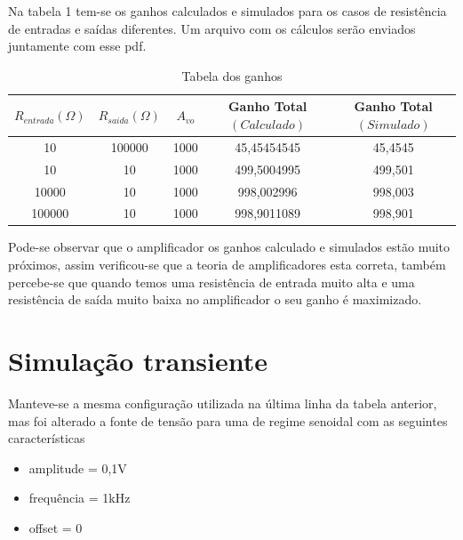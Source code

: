 \documentclass[a4paper, 12pt]{article}
\begin{document}
Na tabela 1 tem-se os ganhos calculados e simulados para os casos de resistência de entradas e saídas diferentes. Um arquivo com os cálculos serão enviados juntamente com esse pdf.
\begin{table}[H]
\centering
\caption{Tabela dos ganhos}
\label{my-label}
\begin{tabular}{|c|c|c|c|c|}
\hline
\textbf{$R_{entrada} (\Omega)$} & \textbf{$R_{saida} (\Omega)$} & \textbf{$A_{vo}$} & \textbf{Ganho Total $( Calculado )$} & \textbf{Ganho Total $( Simulado )$} \\ \hline
10                              & 100000                        & 1000              & 45,45454545                        & 45,4545                           \\ \hline
10                              & 10                            & 1000              & 499,5004995                        & 499,501                           \\ \hline
10000                           & 10                            & 1000              & 998,002996                         & 998,003                           \\ \hline
100000                          & 10                            & 1000              & 998,9011089                        & 998,901                           \\ \hline
\end{tabular}
\end{table}

Pode-se observar que o amplificador  os ganhos calculado e simulados estão muito próximos, assim verificou-se que a teoria de amplificadores esta correta, também percebe-se que  quando temos uma resistência de entrada muito alta e uma resistência de saída muito baixa no amplificador o seu ganho é maximizado.

\section{Simulação transiente}
Manteve-se a mesma configuração utilizada na última linha da tabela anterior, mas foi alterado a fonte de tensão para uma de regime senoidal com as seguintes características
\begin{itemize}
\item amplitude = 0,1V
\item frequência  = 1kHz
\item offset = 0
\end{itemize}
\end{document}

